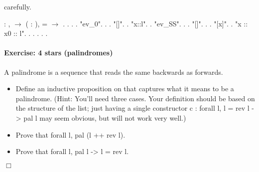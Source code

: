 \documentclass[12pt]{report}
\begin{document}
carefully. \begin{coqdoccode}
\coqdocemptyline
\coqdocnoindent
{} : \coqdockw{\ensuremath{\forall}}  ,   \ensuremath{\rightarrow} \coqdockw{\ensuremath{\forall}} ( :  ),  =   \ensuremath{\rightarrow}  .\coqdoceol
\coqdocnoindent
{}.\coqdoceol
\coqdocindent{1.00em}
   .\coqdoceol
\coqdocindent{1.00em}
 .\coqdoceol
\coqdocindent{1.00em}
 "ev\_0".   .  .\coqdoceol
\coqdocindent{2.00em}
 "[]".  .\coqdoceol
\coqdocindent{2.00em}
 "x::l".  .\coqdoceol
\coqdocindent{1.00em}
 "ev\_SS".   .  .\coqdoceol
\coqdocindent{2.00em}
 "[]".  .  .\coqdoceol
\coqdocindent{2.00em}
 "[x]".  .\coqdoceol
\coqdocindent{2.00em}
 "x :: x0 :: l".  .  .  . .\coqdoceol
\coqdocnoindent
{}.\coqdoceol
\coqdocemptyline
\end{coqdoccode}
\paragraph{Exercise: 4 stars (palindromes)}

 A palindrome is a sequence that reads the same backwards as
    forwards.



\begin{itemize}
\item  Define an inductive proposition  on   that
      captures what it means to be a palindrome. (Hint: You'll need
      three cases.  Your definition should be based on the structure
      of the list; just having a single constructor
        c : forall l, l = rev l -> pal l
      may seem obvious, but will not work very well.)



\item  Prove  that 
       forall l, pal (l ++ rev l).

\item  Prove  that 
       forall l, pal l -> l = rev l.

\end{itemize}
\begin{coqdoccode}
\coqdocemptyline
\end{coqdoccode}
\ensuremath{\Box} \begin{coqdoccode}
\coqdocemptyline
\coqdocemptyline
\end{coqdoccode}
\end{document}
